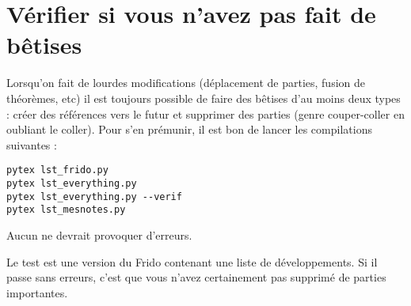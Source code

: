 \section{Vérifier si vous n'avez pas fait de bêtises}

Lorsqu'on fait de lourdes modifications (déplacement de parties, fusion de théorèmes, etc) il est toujours possible de faire des bêtises d'au moins deux types : créer des références vers le futur et supprimer des parties (genre couper-coller en oubliant le coller). Pour s'en prémunir, il est bon de lancer les compilations suivantes :
\begin{verbatim}
pytex lst_frido.py
pytex lst_everything.py 
pytex lst_everything.py --verif
pytex lst_mesnotes.py 
\end{verbatim}
Aucun ne devrait provoquer d'erreurs.

Le test  est une version du Frido contenant une liste de développements. Si il passe sans erreurs, c'est que vous n'avez certainement pas supprimé de parties importantes.


